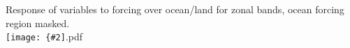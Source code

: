 \documentclass[12pt,a4paper]{article}
\newcommand{\pdffig}[2][0.5]{\texttt{[image: \{\#2]}.pdf}}
\begin{document}
\section{}
Response of variables to forcing over ocean/land for zonal bands, ocean forcing 
region masked.\\
\pdffig[1.0]{oc_ln_var}
\end{document}
